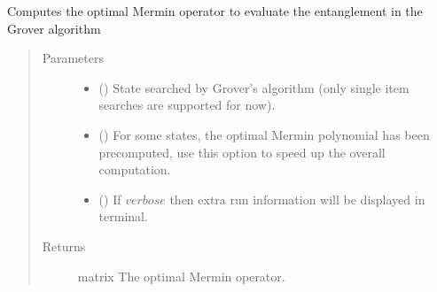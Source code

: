 \documentclass[letterpaper,10pt,english]{sphinxmanual}
\begin{document}
\begin{fulllineitems}
\label{\detokenize{grover:grover.grover_optimize}}
Computes the optimal Mermin operator to evaluate the entanglement in the
Grover algorithm
\begin{quote}\begin{description}
\item[{Parameters}] \leavevmode\begin{itemize}
\item {} 
 (\sphinxstyleliteralemphasis{\sphinxupquote{{[}}}\sphinxstyleliteralemphasis{\sphinxupquote{{]}}}) \textendash{} State searched by Grover’s algorithm 
(only single item searches are supported for now).

\item {} 
 () \textendash{} For some states, the optimal Mermin polynomial 
has been precomputed, use this option to speed up the overall computation.

\item {} 
 () \textendash{} If \(verbose\) then extra run information will be displayed 
in terminal.

\end{itemize}

\item[{Returns}] \leavevmode
matrix \textendash{} The optimal Mermin operator.

\end{description}\end{quote}

\end{fulllineitems}

\end{document}
